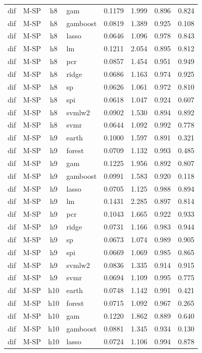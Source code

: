 \begin{ThreePartTable}
\begin{longtable}[t]{llclcccc}
dif & M-SP & h8 & gam & 0.1179 & 1.999 & 0.896 & 0.824\\
dif & M-SP & h8 & gamboost & 0.0819 & 1.389 & 0.925 & 0.108\\
dif & M-SP & h8 & lasso & 0.0646 & 1.096 & 0.978 & 0.843\\
dif & M-SP & h8 & lm & 0.1211 & 2.054 & 0.895 & 0.812\\
dif & M-SP & h8 & pcr & 0.0857 & 1.454 & 0.951 & 0.949\\
dif & M-SP & h8 & ridge & 0.0686 & 1.163 & 0.974 & 0.925\\
dif & M-SP & h8 & sp & 0.0626 & 1.061 & 0.972 & 0.810\\
dif & M-SP & h8 & spi & 0.0618 & 1.047 & 0.924 & 0.607\\
dif & M-SP & h8 & svmlw2 & 0.0902 & 1.530 & 0.894 & 0.892\\
dif & M-SP & h8 & svmr & 0.0644 & 1.092 & 0.992 & 0.778\\
\addlinespace
dif & M-SP & h9 & earth & 0.1000 & 1.597 & 0.891 & 0.321\\
dif & M-SP & h9 & forest & 0.0709 & 1.132 & 0.993 & 0.485\\
dif & M-SP & h9 & gam & 0.1225 & 1.956 & 0.892 & 0.807\\
dif & M-SP & h9 & gamboost & 0.0991 & 1.583 & 0.920 & 0.118\\
dif & M-SP & h9 & lasso & 0.0705 & 1.125 & 0.988 & 0.894\\
dif & M-SP & h9 & lm & 0.1431 & 2.285 & 0.897 & 0.814\\
dif & M-SP & h9 & pcr & 0.1043 & 1.665 & 0.922 & 0.933\\
dif & M-SP & h9 & ridge & 0.0731 & 1.166 & 0.983 & 0.944\\
dif & M-SP & h9 & sp & 0.0673 & 1.074 & 0.989 & 0.905\\
dif & M-SP & h9 & spi & 0.0669 & 1.069 & 0.985 & 0.865\\
dif & M-SP & h9 & svmlw2 & 0.0836 & 1.335 & 0.914 & 0.915\\
dif & M-SP & h9 & svmr & 0.0694 & 1.109 & 0.995 & 0.775\\
\addlinespace
dif & M-SP & h10 & earth & 0.0748 & 1.142 & 0.991 & 0.421\\
dif & M-SP & h10 & forest & 0.0715 & 1.092 & 0.967 & 0.265\\
dif & M-SP & h10 & gam & 0.1220 & 1.862 & 0.889 & 0.640\\
dif & M-SP & h10 & gamboost & 0.0881 & 1.345 & 0.934 & 0.130\\
dif & M-SP & h10 & lasso & 0.0724 & 1.106 & 0.994 & 0.878\\

\end{longtable}
\end{ThreePartTable}
